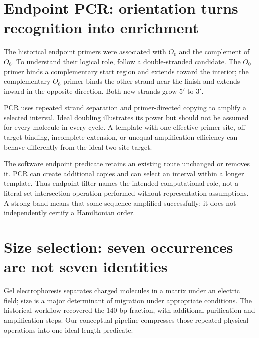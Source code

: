 \section{Endpoint PCR: orientation turns recognition into enrichment}
The historical endpoint primers were associated with $O_0$ and the complement of $O_6$.\cite{Adleman1994} To understand their logical role, follow a double-stranded candidate. The $O_0$ primer binds a complementary start region and extends toward the interior; the complementary-$O_6$ primer binds the other strand near the finish and extends inward in the opposite direction. Both new strands grow $5'$ to $3'$.


PCR uses repeated strand separation and primer-directed copying to amplify a selected interval.\cite{NHGRIPCR} Ideal doubling illustrates its power but should not be assumed for every molecule in every cycle. A template with one effective primer site, off-target binding, incomplete extension, or unequal amplification efficiency can behave differently from the ideal two-site target.

The software endpoint predicate retains an existing route unchanged or removes it. PCR can create additional copies and can select an interval within a longer template. Thus endpoint filter names the intended computational role, not a literal set-intersection operation performed without representation assumptions. A strong band means that some sequence amplified successfully; it does not independently certify a Hamiltonian order.

\section{Size selection: seven occurrences are not seven identities}
Gel electrophoresis separates charged molecules in a matrix under an electric field; size is a major determinant of migration under appropriate conditions.\cite{NHGRIElectrophoresis} The historical workflow recovered the 140-bp fraction, with additional purification and amplification steps. Our conceptual pipeline compresses those repeated physical operations into one ideal length predicate.


